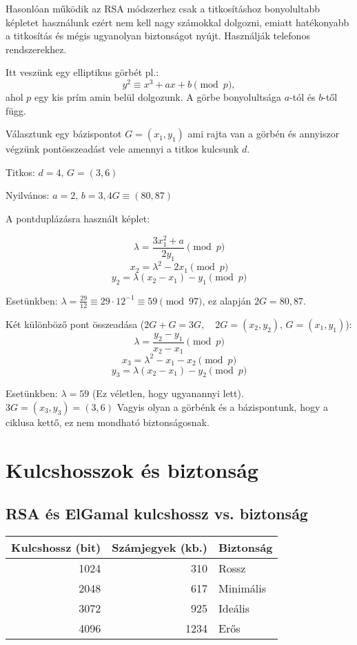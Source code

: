 Hasonlóan működik az RSA módszerhez csak a titkosításhoz bonyolultabb
képletet használunk ezért nem kell nagy számokkal dolgozni, emiatt
hatékonyabb a titkosítás és mégis ugyanolyan biztonságot nyújt. Használják
telefonos rendszerekhez.

Itt veszünk egy elliptikus görbét pl.: 
\[
y^{2}\equiv x^{3}+ax+b\pmod p,
\]
ahol $p$ egy kis prím amin belül dolgozunk. A görbe bonyolultsága
$a$-tól és $b$-től függ.

Választunk egy bázispontot $G=(x_{1},y_{1})$ ami rajta van a görbén
és annyiszor végzünk pontösszeadást vele amennyi a titkos kulcsunk
$d$.

\begin{example}
Titkos: $d=4,\,G=(3,6)$

Nyilvános: $a=2,\,b=3,4G\equiv(80,87)$

A pontduplázásra használt képlet:

\[
\lambda=\frac{3x_{1}^{2}+a}{2y_{1}}\pmod p
\]
\[
x_{2}=\lambda^{2}-2x_{1}\pmod p
\]
\[
y_{2}=\lambda(x_{2}-x_{1})-y_{1}\pmod p
\]

Esetünkben: $\lambda=\frac{29}{12}\equiv29\cdot12^{-1}\equiv59\pmod{97}$,
ez alapján $2G=80,87$. \vspace{1em}

Két különböző pont összeadása ($2G+G=3G,\quad2G=(x_{2},y_{2}),\,G=(x_{1},y_{1})$):
\[
\lambda=\frac{y_{2}-y_{1}}{x_{2}-x_{1}}\pmod p
\]
\[
x_{3}=\lambda^{2}-x_{1}-x_{2}\pmod p
\]
\[
y_{3}=\lambda(x_{2}-x_{1})-y_{2}\pmod p
\]

Esetünkben: $\lambda=59$ (Ez véletlen, hogy ugyanannyi lett). $3G=(x_{3},y_{3})=(3,6)$
Vagyis olyan a görbénk és a bázispontunk, hogy a ciklusa kettő, ez
nem mondható biztonságosnak.
\end{example}

\section*{Kulcshosszok és biztonság}

\subsection*{RSA és ElGamal kulcshossz vs. biztonság}
\begin{center}
\begin{tabular}{rrl}
\hline 
\textbf{Kulcshossz (bit)}  & \textbf{Számjegyek (kb.)}  & \textbf{Biztonság} \tabularnewline
\hline 
1024  & 310  & Rossz \tabularnewline
2048  & 617  & Minimális \tabularnewline
3072  & 925  & Ideális \tabularnewline
4096  & 1234  & Erős \tabularnewline
\hline 
\end{tabular}
\par\end{center}

